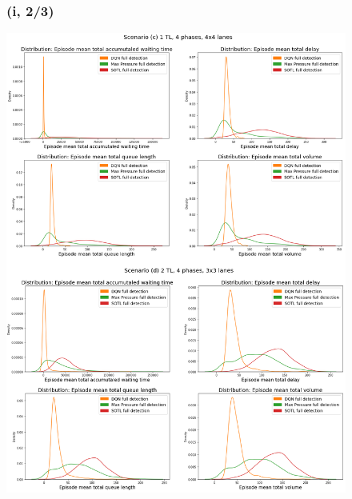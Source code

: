 \begin{figure}[h]
\subsubsection*{(i, 2/3)}
\includegraphics[width=\textwidth]{img/Appendix/1_3-4.png}
\centering
\end{figure}
\restoregeometry

\pagebreak

